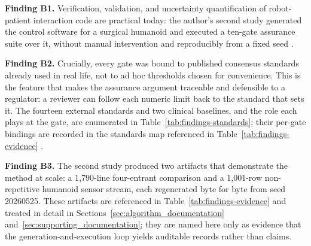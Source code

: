 \textbf{Finding B1.} Verification, validation, and uncertainty quantification of
robot-patient interaction code are practical today: the author's second study
generated the control software for a surgical humanoid and executed a ten-gate
assurance suite over it, without manual intervention and reproducibly from a
fixed seed \cite{kawchak2026vvuq02}.

\textbf{Finding B2.} Crucially, every gate was bound to published consensus
standards already used in real life, not to ad hoc thresholds chosen for
convenience. This is the feature that makes the assurance argument traceable and
defensible to a regulator: a reviewer can follow each numeric limit back to the
standard that sets it. The fourteen external standards and two clinical baselines,
and the role each plays at the gate, are enumerated in
Table~\ref{tab:findings-standards}; their per-gate bindings are recorded in the
standards map referenced in Table~\ref{tab:findings-evidence}
\cite{asmevv40, nasastd7009a, iec8060127, iec60601, isots15066, iso13482,
iso10218, iso9283, iec62304, iso14971, iso13849, ul4600, ieee7009,
fda2023credibility}.

\textbf{Finding B3.} The second study produced two artifacts that demonstrate the
method at scale: a 1{,}790-line four-entrant comparison and a 1{,}001-row
non-repetitive humanoid sensor stream, each regenerated byte for byte from seed
20260525. These artifacts are referenced in Table~\ref{tab:findings-evidence} and
treated in detail in Sections~\ref{sec:algorithm_documentation}
and~\ref{sec:supporting_documentation}; they are named here only as evidence that
the generation-and-execution loop yields auditable records rather than claims.


